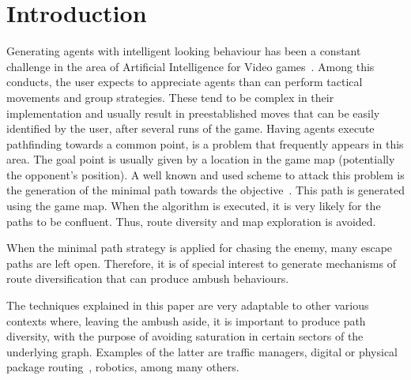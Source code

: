 \section{Introduction}
Generating agents with intelligent looking behaviour
has been a constant challenge in the area of Artificial
Intelligence for Video games~\cite{book1}. Among this
conducts, the user expects to appreciate agents than can
perform tactical movements and group strategies. These
tend to be complex in their implementation and usually
result in preestablished moves that can be easily identified
by the user, after several runs of the game. Having agents
execute pathfinding towards a common point, is a problem
that frequently appears in this area. The goal point is
usually given by a location in the game map  (potentially
the opponent's position). A well known and used scheme to
attack this problem is the generation of the minimal path
towards the objective~\cite{art2,book4}. This path is
generated using the game map.  When the algorithm is executed,
it is very likely for the paths to be confluent. Thus,
route diversity and map exploration is avoided.
  
When the minimal path strategy is applied for chasing
the enemy, many escape paths are left open. Therefore,
it is of special interest to generate mechanisms of route
diversification that can produce ambush behaviours.

The techniques explained in this paper are very adaptable
to other various contexts where,  leaving the ambush aside,
it is important to produce path diversity, with the purpose of 
avoiding saturation in certain sectors of the underlying graph. 
Examples of the latter are traffic managers, digital or physical
package routing~\cite{art4}, robotics, among many others.
